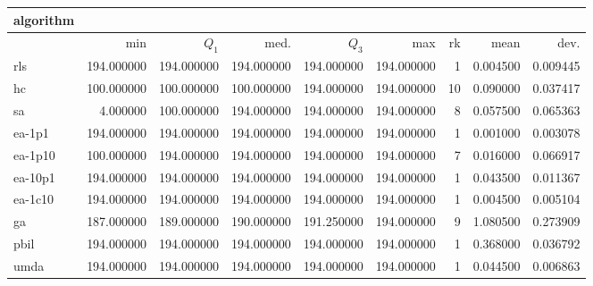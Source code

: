 \begin{tabular}{@{}l*{5}{>{{}}N{3}{0}}>{{}}N{2}{0}N{1}{3}N{1}{3}@{}}
\toprule
{algorithm} &  &  \\
\midrule
& {min} & {$Q_1$} & {med.} & {$Q_3$} & {max} & {rk} & {mean} & {dev.} \\
\midrule
rls & {\color{blue}} 194.000000 & {\color{blue}} 194.000000 & {\color{blue}} 194.000000 & {\color{blue}} 194.000000 & {\color{blue}} 194.000000 & 1 & 0.004500 & 0.009445 \\
 hc & 100.000000 & 100.000000 & 100.000000 & {\color{blue}} 194.000000 & {\color{blue}} 194.000000 & 10 & 0.090000 & 0.037417 \\
 sa & 4.000000 & 100.000000 & {\color{blue}} 194.000000 & {\color{blue}} 194.000000 & {\color{blue}} 194.000000 & 8 & 0.057500 & 0.065363 \\
 ea-1p1 & {\color{blue}} 194.000000 & {\color{blue}} 194.000000 & {\color{blue}} 194.000000 & {\color{blue}} 194.000000 & {\color{blue}} 194.000000 & 1 & 0.001000 & 0.003078 \\
 ea-1p10 & 100.000000 & {\color{blue}} 194.000000 & {\color{blue}} 194.000000 & {\color{blue}} 194.000000 & {\color{blue}} 194.000000 & 7 & 0.016000 & 0.066917 \\
 ea-10p1 & {\color{blue}} 194.000000 & {\color{blue}} 194.000000 & {\color{blue}} 194.000000 & {\color{blue}} 194.000000 & {\color{blue}} 194.000000 & 1 & 0.043500 & 0.011367 \\
 ea-1c10 & {\color{blue}} 194.000000 & {\color{blue}} 194.000000 & {\color{blue}} 194.000000 & {\color{blue}} 194.000000 & {\color{blue}} 194.000000 & 1 & 0.004500 & 0.005104 \\
 ga & 187.000000 & 189.000000 & 190.000000 & 191.250000 & {\color{blue}} 194.000000 & 9 & 1.080500 & 0.273909 \\
 pbil & {\color{blue}} 194.000000 & {\color{blue}} 194.000000 & {\color{blue}} 194.000000 & {\color{blue}} 194.000000 & {\color{blue}} 194.000000 & 1 & 0.368000 & 0.036792 \\
 umda & {\color{blue}} 194.000000 & {\color{blue}} 194.000000 & {\color{blue}} 194.000000 & {\color{blue}} 194.000000 & {\color{blue}} 194.000000 & 1 & 0.044500 & 0.006863 \\
 \bottomrule
\end{tabular}
